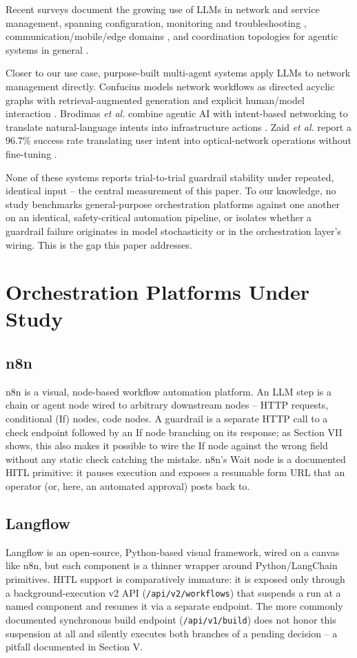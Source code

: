 \documentclass[conference]{IEEEtran}
\begin{document}
Recent surveys document the growing use of LLMs in network and service management, spanning configuration, monitoring and troubleshooting \cite{hong2025survey}, communication/mobile/edge domains \cite{boateng2025survey}, and coordination topologies for agentic systems in general \cite{futureinternet2026}.

Closer to our use case, purpose-built multi-agent systems apply LLMs to network management directly. Confucius models network workflows as directed acyclic graphs with retrieval-augmented generation and explicit human/model interaction \cite{wang2025confucius}. Brodimas \textit{et al.} combine agentic AI with intent-based networking to translate natural-language intents into infrastructure actions \cite{brodimas2025intent}. Zaid \textit{et al.} report a 96.7\% success rate translating user intent into optical-network operations without fine-tuning \cite{zaid2025multiagent}.

None of these systems reports trial-to-trial guardrail stability under repeated, identical input -- the central measurement of this paper. To our knowledge, no study benchmarks general-purpose orchestration platforms against one another on an identical, safety-critical automation pipeline, or isolates whether a guardrail failure originates in model stochasticity or in the orchestration layer's wiring. This is the gap this paper addresses.

\section{Orchestration Platforms Under Study}

\subsection{n8n}
n8n is a visual, node-based workflow automation platform. An LLM step is a chain or agent node wired to arbitrary downstream nodes -- HTTP requests, conditional (If) nodes, code nodes. A guardrail is a separate HTTP call to a check endpoint followed by an If node branching on its response; as Section VII shows, this also makes it possible to wire the If node against the wrong field without any static check catching the mistake. n8n's Wait node is a documented HITL primitive: it pauses execution and exposes a resumable form URL that an operator (or, here, an automated approval) posts back to.

\subsection{Langflow}
Langflow is an open-source, Python-based visual framework, wired on a canvas like n8n, but each component is a thinner wrapper around Python/LangChain primitives. HITL support is comparatively immature: it is exposed only through a background-execution v2 API (\texttt{/api/v2/workflows}) that suspends a run at a named component and resumes it via a separate endpoint. The more commonly documented synchronous build endpoint (\texttt{/api/v1/build}) does not honor this suspension at all and silently executes both branches of a pending decision -- a pitfall documented in Section V.
\end{document}
